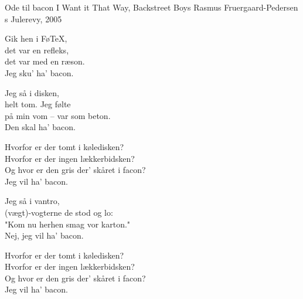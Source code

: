 \begin{song}{Ode til bacon}
  {} %
  {I Want it That Way, Backstreet Boys} %
  {Rasmus Fruergaard-Pedersen} %
  {\TKET{}s Julerevy, 2005} %
  {\NotCCLIed} %

  \begin{SBVerse}
    Gik hen i Fø\TeX,\\
    det var en refleks,\\
    det var med en ræson.\\
    Jeg sku’ ha’ bacon.
  \end{SBVerse}

  \begin{SBVerse}
    Jeg så i disken,\\
    helt tom. Jeg følte\\
    på min vom – var som beton.\\
    Den skal ha’ bacon.
  \end{SBVerse}

  \begin{SBChorus}
    Hvorfor er der tomt i køledisken?\\
    Hvorfor er der ingen lækkerbidsken?\\
    Og hvor er den gris der’ skåret i facon?\\
    Jeg vil ha’ bacon.
  \end{SBChorus}

  \begin{SBVerse}
    Jeg så i vantro,\\
    (vægt)-vogterne de stod og lo:\\
    "Kom nu herhen smag vor karton."\\
    Nej, jeg vil ha’ bacon.
  \end{SBVerse}

  \begin{SBChorus}
    Hvorfor er der tomt i køledisken?\\
    Hvorfor er der ingen lækkerbidsken?\\
    Og hvor er den gris der’ skåret i facon?\\
    Jeg vil ha’ bacon.
  \end{SBChorus}



\end{song}
